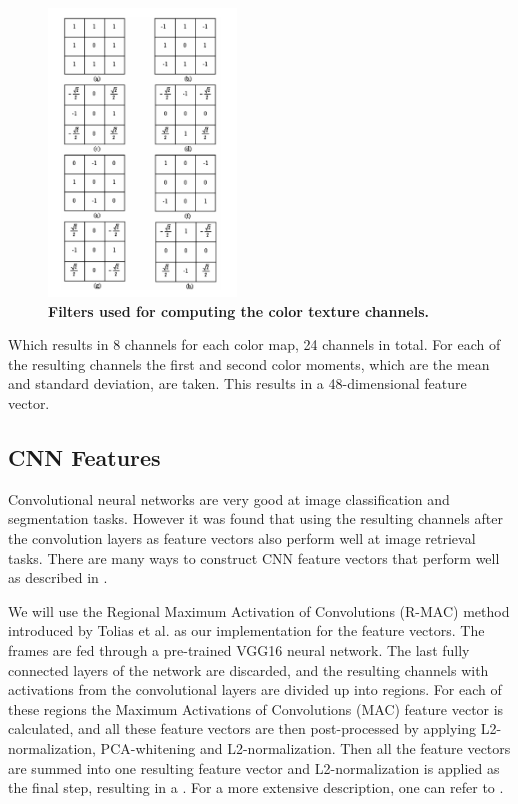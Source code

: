 \documentclass{article}
\begin{document}
\begin{figure}[H]
	\includegraphics[width=5cm]{images/filters.png}
	\centering
	\caption{\textbf{Filters used for computing the color texture channels.}}
	\label{fig:filters}
\end{figure}

Which results in 8 channels for each color map, 24 channels in total. For each of the resulting channels the first and second color moments, which are the mean and standard deviation, are taken. This results in a 48-dimensional feature vector.

\subsection{CNN Features} 
Convolutional neural networks are very good at image classification and segmentation tasks. However it was found that using the resulting channels after the convolution layers as feature vectors also perform well at image retrieval tasks. There are many ways to construct CNN feature vectors that perform well as described in \cite{zheng2018sift}.

We will use the Regional Maximum Activation of Convolutions (R-MAC) method introduced by Tolias et al. \cite{tolias2015particular} as our implementation for the feature vectors. The frames are fed through a pre-trained VGG16 neural network. The last fully connected layers of the network are discarded, and the resulting channels with activations from the convolutional layers are divided up into regions. For each of these regions the Maximum Activations of Convolutions (MAC) feature vector is calculated, and all these feature vectors are then post-processed by applying L2-normalization, PCA-whitening and L2-normalization. Then all the feature vectors are summed into one resulting feature vector and L2-normalization is applied as the final step, resulting in a . For a more extensive description, one can refer to \cite{tolias2015particular}.
\end{document}
